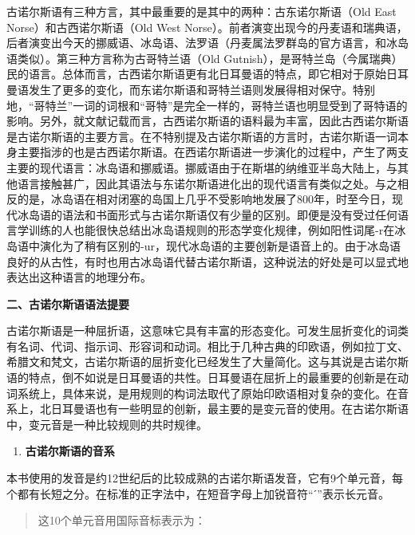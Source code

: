 古诺尔斯语有三种方言，其中最重要的是其中的两种：古东诺尔斯语（Old East
Norse）和古西诺尔斯语（Old West
Norse）。前者演变出现今的丹麦语和瑞典语，后者演变出今天的挪威语、冰岛语、法罗语（丹麦属法罗群岛的官方语言，和冰岛语类似）。第三种方言称为古哥特兰语（Old
Gutnish），是哥特兰岛（今属瑞典）民的语言。总体而言，古西诺尔斯语更有北日耳曼语的特点，即它相对于原始日耳曼语发生了更多的变化，而东诺尔斯语和哥特兰语则发展得相对保守。特别地，``哥特兰''一词的词根和``哥特''是完全一样的，哥特兰语也明显受到了哥特语的影响。另外，就文献记载而言，古西诺尔斯语的语料最为丰富，因此古西诺尔斯语是古诺尔斯语的主要方言。在不特别提及古诺尔斯语的方言时，古诺尔斯语一词本身主要指涉的也是古西诺尔斯语。在西诺尔斯语进一步演化的过程中，产生了两支主要的现代语言：冰岛语和挪威语。挪威语由于在斯堪的纳维亚半岛大陆上，与其他语言接触甚广，因此其语法与东诺尔斯语进化出的现代语言有类似之处。与之相反的是，冰岛语在相对闭塞的岛国上几乎不受影响地发展了800年，时至今日，现代冰岛语的语法和书面形式与古诺尔斯语仅有少量的区别。即便是没有受过任何语言学训练的人也能很快总结出冰岛语规则的形态学变化规律，例如阳性词尾-r在冰岛语中演化为了稍有区别的-ur，现代冰岛语的主要创新是语音上的。由于冰岛语良好的从古性，有时也用古冰岛语代替古诺尔斯语，这种说法的好处是可以显式地表达出这种语言的地理分布。

\textbf{二、古诺尔斯语语法提要}

古诺尔斯语是一种屈折语，这意味它具有丰富的形态变化。可发生屈折变化的词类有名词、代词、指示词、形容词和动词。相比于几种古典的印欧语，例如拉丁文、希腊文和梵文，古诺尔斯语的屈折变化已经发生了大量简化。这与其说是古诺尔斯语的特点，倒不如说是日耳曼语的共性。日耳曼语在屈折上的最重要的创新是在动词系统上，具体来说，是用规则的构词法取代了原始印欧语相对复杂的变化。在音系上，北日耳曼语也有一些明显的创新，最主要的是变元音的使用。在古诺尔斯语中，变元音是一种比较规则的共时规律。

\begin{enumerate}
\def\labelenumi{\Alph{enumi}.}
\item
  \textbf{古诺尔斯语的音系}
\end{enumerate}

本书使用的发音是约12世纪后的比较成熟的古诺尔斯语发音，它有9个单元音，每个都有长短之分。在标准的正字法中，在短音字母上加锐音符``ˊ''表示长元音。

\begin{quote}
这10个单元音用国际音标表示为：
\end{quote}

